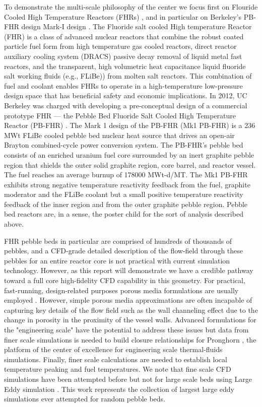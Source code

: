 To demonstrate the multi-scale philosophy of the center we focus first on Flouride Cooled High Temperature Reactors (FHRs) \cite{forsberg2015fluoride}, and in particular on Berkeley's PB-FHR design Mark-I design \cite{cisneros2014technical}. The Fluoride salt cooled High temperature Reactor (FHR) is a class of advanced nuclear reactors that combine the robust coated particle fuel form from high temperature gas cooled reactors, direct reactor auxiliary cooling system (DRACS) passive decay removal of liquid metal fast reactors, and the transparent, high volumetric heat capacitance liquid fluoride salt working fluids (e.g., FLiBe)) from molten salt reactors. This combination of fuel and coolant enables FHRs to operate in a high-temperature low-pressure design space that has beneficial safety and economic implications. In 2012, UC Berkeley was charged with developing a pre-conceptual design of a commercial prototype FHR --- the Pebble Bed Fluoride Salt Cooled High Temperature Reactor (PB-FHR) \cite{cisneros2014technical}. The Mark 1 design of the PB-FHR (Mk1 PB-FHR) is a 236 MWt FLiBe cooled pebble bed nuclear heat source that drives an open-air Brayton combined-cycle power conversion system. The PB-FHR's pebble bed consists of an enriched uranium fuel core surrounded by an inert graphite pebble region that shields the outer solid graphite region, core barrel, and reactor vessel. The fuel reaches an average burnup of 178000 MWt-d/MT. The Mk1 PB-FHR exhibits strong negative temperature reactivity feedback from the fuel, graphite moderator and the FLiBe coolant but a small positive temperature reactivity feedback of the inner region and from the outer graphite pebble region. Pebble bed reactors are, in a sense, the poster child for the sort of analysis described above.

FHR pebble beds in particular are comprised of hundreds of thousands of pebbles, and a CFD-grade detailed description of the flow-field through these pebbles for an entire reactor core is not practical with current simulation technology. However, as this report will demonstrate we have a credible pathway toward a full core high-fidelity CFD capability in this geometry. For practical, fast-running, design-related purposes porous media formulations are usually employed  \cite{zou2017validation}. However, simple porous media approximations are often incapable of capturing key details of the flow field such as the wall channeling effect due to the change in porosity in the proximity of the vessel walls.  Advanced formulations for the "engineering scale" have the potential to address these issues but data from finer scale simulations is needed to build closure relationships for Pronghorn \cite{novak2018pronghorn}, the platform of the center of excellence for engineering scale thermal-fluids simulations. Finally, finer scale calculations are needed to establish local temperature peaking and fuel temperatures. We note that fine scale CFD simulations have been attempted before but not for large scale beds using Large Eddy simulation \cite{vanstaden2018}. This work represents the collection of largest large eddy simulations ever attempted for random pebble beds.

